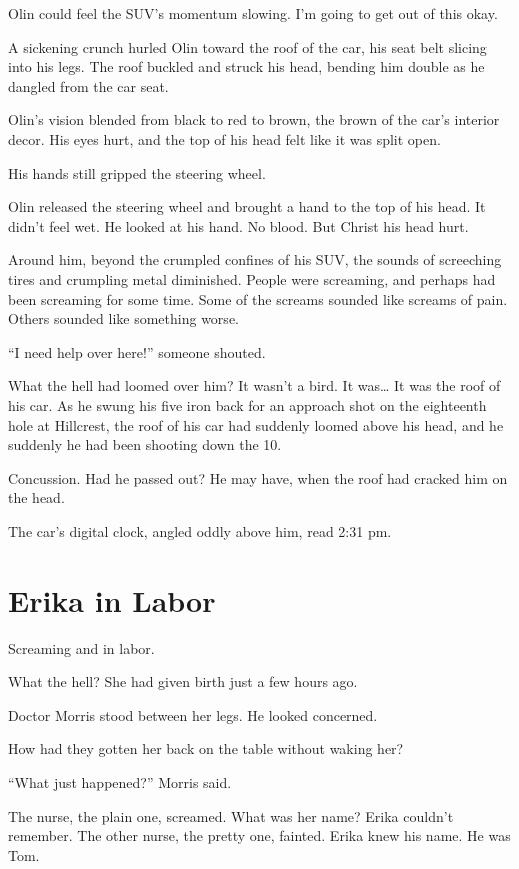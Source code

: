 Olin could feel the SUV’s momentum slowing. I’m going to get out of this okay.

A sickening crunch hurled Olin toward the roof of the car, his seat belt slicing into his legs. The roof buckled and struck his head, bending him double as he dangled from the car seat.

Olin’s vision blended from black to red to brown, the brown of the car’s interior decor. His eyes hurt, and the top of his head felt like it was split open.

His hands still gripped the steering wheel.

Olin released the steering wheel and brought a hand to the top of his head. It didn’t feel wet. He looked at his hand. No blood. But Christ his head hurt.

Around him, beyond the crumpled confines of his SUV, the sounds of screeching tires and crumpling metal diminished. People were screaming, and perhaps had been screaming for some time. Some of the screams sounded like screams of pain. Others sounded like something worse.

“I need help over here!” someone shouted.

What the hell had loomed over him? It wasn’t a bird. It was… It was the roof of his car. As he swung his five iron back for an approach shot on the eighteenth hole at Hillcrest, the roof of his car had suddenly loomed above his head, and he suddenly he had been shooting down the 10.

Concussion. Had he passed out? He may have, when the roof had cracked him on the head.

The car’s digital clock, angled oddly above him, read 2:31 pm.



\chapter{Erika in Labor}

 Screaming and in labor.

What the hell? She had given birth just a few hours ago.

Doctor Morris stood between her legs. He looked concerned.

How had they gotten her back on the table without waking her?

“What just happened?” Morris said.

The nurse, the plain one, screamed. What was her name? Erika couldn’t remember. The other nurse, the pretty one, fainted. Erika knew his name. He was Tom.

